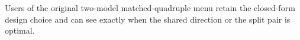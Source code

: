 Users of the original two-model matched-quadruple menu retain the closed-form design choice and can see exactly when the shared direction or the split pair is optimal.